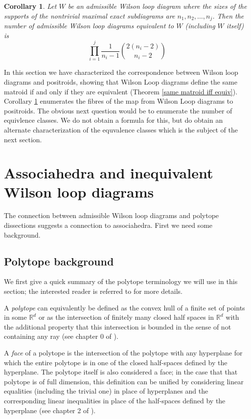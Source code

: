 \documentclass[11pt]{article}
\newcommand{\sanote}{\todo[color=violet!30]}
\newtheorem{cor}[thm]{Corollary}
\theoremstyle{remark}
\theoremstyle{definition}
\begin{document}
\begin{cor}\label{number of equiv diagrams}
  Let $W$ be an admissible Wilson loop diagram where the sizes of the supports of the nontrivial maximal exact subdiagrams are $n_1, n_2, \ldots, n_j$.  Then the number of admissible Wilson loop diagrams equivalent to $W$ (including $W$ itself) is
  \[
  \prod_{i=1}^{j} \frac{1}{n_i-1}\binom{2(n_i-2)}{n_i-2}
  \]
\end{cor}

In this section we have characterized the correspondence between Wilson loop diagrams and positroids, showing that Wilson Loop diagrams define the same matroid if and only if they are equivalent (Theorem \ref{same matroid iff equiv}). Corollary \ref{number of equiv diagrams} enumerates the fibres of the map from Wilson Loop diagrams to positroids.  The obvious next question would be to enumerate the number of equivlence classes.  We do not obtain a formula for this, but do obtain an alternate characterization of the equvalence classes which is the subject of the next section.

\section{Associahedra and inequivalent Wilson loop diagrams}\label{sec associahedron}

The connection between admissible Wilson loop diagrams and polytope dissections suggests a connection to associahedra. First we need some background. \sanote{expand}

\subsection{Polytope background}\label{sec polytope background}

We first give a quick summary of the polytope terminology we will use in this section; the interested reader is referred to \cite{Ziegler} for more details.

A \emph{polytope} can equivalently be defined as the convex hull of a finite set of points in some $\mathbb{R}^d$ or as the intersection of finitely many closed half spaces in $\mathbb{R}^d$ with the additional property that this intersection is bounded in the sense of not containing any ray (see chapter 0 of \cite{Ziegler}).

A \emph{face} of a polytope is the intersection of the polytope with any hyperplane for which the entire polytope is in one of the closed half-spaces defined by the hyperplane.  The polytope itself is also considered a face; in the case that that polytope is of full dimension, this definition can be unified by considering linear equalities (including the trivial one) in place of hyperplanes and the corresponding linear inequalities in place of the half-spaces defined by the hyperplane (see chapter 2 of \cite{Ziegler}).  
\end{document}
